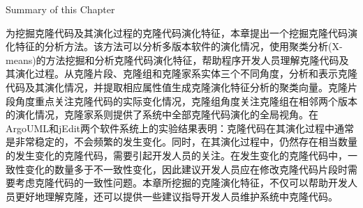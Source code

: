 
{Summary of  this Chapter}
 
为挖掘克隆代码及其演化过程的克隆代码演化特征，本章提出一个挖掘克隆代码演化特征的分析方法。该方法可以分析多版本软件的演化情况，使用聚类分析(X-means)的方法挖掘和分析克隆代码演化特征，帮助程序开发人员理解克隆代码及其演化过程。从克隆片段、克隆组和克隆家系实体三个不同角度，分析和表示克隆代码及其演化情况，并提取相应属性值生成克隆演化特征分析的聚类向量。克隆片段角度重点关注克隆代码的实际变化情况，克隆组角度关注克隆组在相邻两个版本的演化情况，克隆家系则提供了系统中全部克隆代码演化的全局视角。在ArgoUML和jEdit两个软件系统上的实验结果表明：克隆代码在其演化过程中通常是非常稳定的，不会频繁的发生变化。同时，在其演化过程中，仍然存在相当数量的发生变化的克隆代码，需要引起开发人员的关注。在发生变化的克隆代码中，一致性变化的数量多于不一致性变化，因此建议开发人员应在修改克隆代码片段时需要考虑克隆代码的一致性问题。本章所挖掘的克隆演化特征，不仅可以帮助开发人员更好地理解克隆，还可以提供一些建议指导开发人员维护系统中克隆代码。%

